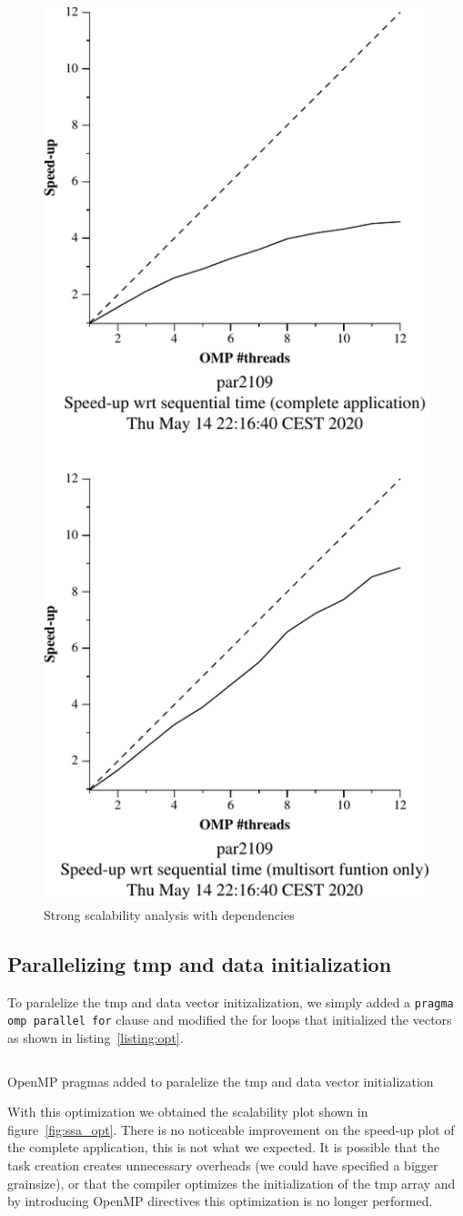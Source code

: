 \begin{figure}[H]
        \centering
        \includegraphics[width=0.35\linewidth]{plots/new-omp-tree-depen-crop.pdf}
        \caption{Strong scalability analysis with dependencies}
        \label{fig:ssa_dep} 
\end{figure}


\subsection{Parallelizing tmp and data initialization}

To paralelize the tmp and data vector initizalization, we simply added a \texttt{pragma omp parallel for}
clause and modified the for loops that initialized the vectors as shown in listing~\ref{listing:opt}.

\begin{listing}[H]
\inputminted[firstline=73,lastline=85]{c}{sources/multisort-omp-tree-depen-opt.c}
\caption{OpenMP pragmas added to paralelize the tmp and data vector initialization}
\label{listing:opt}
\end{listing}

With this optimization we obtained the scalability plot shown in figure~\ref{fig:ssa_opt}. There
is no noticeable improvement on the speed-up plot of the complete application, this is not what we expected.
It is possible that the task creation creates unnecessary overheads (we could have specified a bigger grainsize), or that the compiler optimizes the
initialization of the tmp array and by introducing OpenMP directives this optimization is no longer performed.

